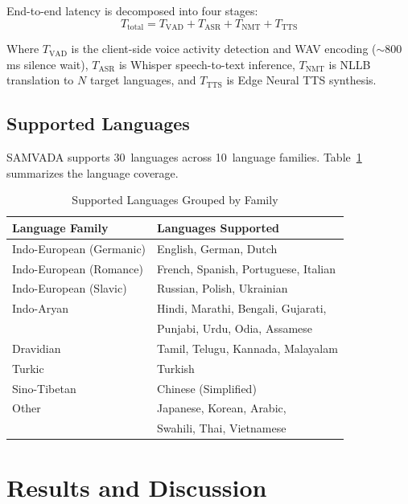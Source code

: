 \documentclass[conference]{IEEEtran}
\begin{document}
End-to-end latency is decomposed into four stages:
\begin{equation}
T_{\text{total}} = T_{\text{VAD}} + T_{\text{ASR}} + T_{\text{NMT}} + T_{\text{TTS}}
\end{equation}

Where $T_{\text{VAD}}$ is the client-side voice activity detection and WAV encoding ($\sim$800\,ms silence wait), $T_{\text{ASR}}$ is Whisper speech-to-text inference, $T_{\text{NMT}}$ is NLLB translation to $N$ target languages, and $T_{\text{TTS}}$ is Edge Neural TTS synthesis.

\subsection{Supported Languages}

SAMVADA supports 30~languages across 10~language families. Table~\ref{tab:languages} summarizes the language coverage.

\begin{table}[htbp]
\centering
\caption{Supported Languages Grouped by Family}
\label{tab:languages}
\renewcommand{\arraystretch}{1.15}
{\small
\begin{tabular}{ll}
\toprule
\textbf{Language Family} & \textbf{Languages Supported} \\
\midrule
Indo-European (Germanic) & English, German, Dutch \\
Indo-European (Romance) & French, Spanish, Portuguese, Italian \\
Indo-European (Slavic) & Russian, Polish, Ukrainian \\
Indo-Aryan & Hindi, Marathi, Bengali, Gujarati, \\
 & Punjabi, Urdu, Odia, Assamese \\
Dravidian & Tamil, Telugu, Kannada, Malayalam \\
Turkic & Turkish \\
Sino-Tibetan & Chinese (Simplified) \\
Other & Japanese, Korean, Arabic, \\
 & Swahili, Thai, Vietnamese \\
\bottomrule
\end{tabular}
}
\end{table}

\section{Results and Discussion}
\label{sec:results}
\end{document}
